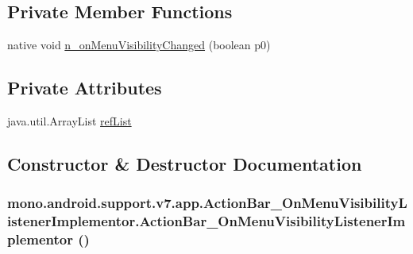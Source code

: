 \subsection*{Private Member Functions}
\begin{CompactItemize}
\item 
native void \hyperlink{classmono_1_1android_1_1support_1_1v7_1_1app_1_1_action_bar___on_menu_visibility_listener_implementor_739722049822f788bed0e0c77d7dee44}{n\_\-onMenuVisibilityChanged} (boolean p0)
\end{CompactItemize}
\subsection*{Private Attributes}
\begin{CompactItemize}
\item 
java.util.ArrayList \hyperlink{classmono_1_1android_1_1support_1_1v7_1_1app_1_1_action_bar___on_menu_visibility_listener_implementor_daba891c34398ac9f06754bddad7276f}{refList}
\end{CompactItemize}


\subsection{Constructor \& Destructor Documentation}
\hypertarget{classmono_1_1android_1_1support_1_1v7_1_1app_1_1_action_bar___on_menu_visibility_listener_implementor_635cd1ac43378cd527774a3cba11dff1}{
\subsubsection[{ActionBar\_\-OnMenuVisibilityListenerImplementor}]{\setlength{\rightskip}{0pt plus 5cm}mono.android.support.v7.app.ActionBar\_\-OnMenuVisibilityListenerImplementor.ActionBar\_\-OnMenuVisibilityListenerImplementor ()}}
\label{classmono_1_1android_1_1support_1_1v7_1_1app_1_1_action_bar___on_menu_visibility_listener_implementor_635cd1ac43378cd527774a3cba11dff1}





